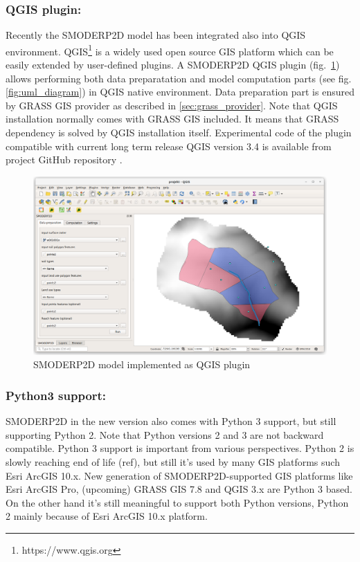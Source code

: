 \subsubsection{QGIS plugin:}
Recently the SMODERP2D model has been integrated also into QGIS
environment. QGIS\footnote{https://www.qgis.org} is a widely used open
source GIS platform which can be easily extended by user-defined
plugins. A SMODERP2D QGIS plugin (fig.~\ref{fig:smoderp2_qgis}) allows
performing both data preparatation and model computation parts (see
fig. \ref{fig:uml_diagram}) in QGIS native environment. Data
preparation part is ensured by GRASS GIS provider as described in
\ref{sec:grass_provider}. Note that QGIS installation normally comes
with GRASS GIS included. It means that GRASS dependency is solved by
QGIS installation itself. Experimental code of the plugin compatible
with current long term release QGIS version 3.4 is available from
project GitHub repository \cite{smoderp2d-github-2019}.

\begin{figure}[ht!]
  \begin{center}
    \includegraphics[width=1.0\columnwidth]{figures/smoderp2d_qgis.png}
    \caption{SMODERP2D model implemented as QGIS plugin}
    \label{fig:smoderp2_qgis}
  \end{center}
\end{figure}

\subsubsection{Python3 support:}
SMODERP2D in the new version also comes with Python 3 support, but
still supporting Python 2. Note that Python versions 2 and 3 are not
backward compatible.  Python 3 support is important from various
perspectives. Python 2 is slowly reaching end of life (ref), but still
it’s used by many GIS platforms such Esri ArcGIS 10.x. New generation
of SMODERP2D-supported GIS platforms like Esri ArcGIS Pro, (upcoming)
GRASS GIS 7.8 and QGIS 3.x are Python 3 based. On the other hand it’s
still meaningful to support both Python versions, Python 2 mainly
because of Esri ArcGIS 10.x platform.

